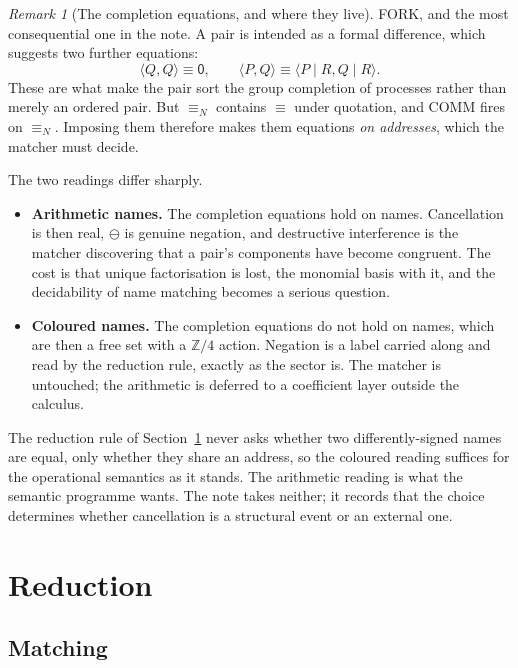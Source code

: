 \documentclass[11pt]{article}
\theoremstyle{definition}
\theoremstyle{remark}
\newtheorem{remark}[theorem]{Remark}
\newcommand{\pzero}{\mathsf{0}}
\newcommand{\dip}[2]{\ensuremath{\langle #1 , #2 \rangle}}
\newcommand{\negop}{\ensuremath{\ominus}}
\newcommand{\scong}{\ensuremath{\equiv}}
\newcommand{\nameq}{\ensuremath{\equiv_{N}}}
\begin{document}
\begin{remark}[The completion equations, and where they live]
\label{rem:completion}
FORK, and the most consequential one in the note. A pair is intended as a formal
difference, which suggests two further equations:
\[
  \dip{Q}{Q} \scong \pzero,
  \qquad
  \dip{P}{Q} \scong \dip{P \mid R}{Q \mid R}.
\]
These are what make the pair sort the group completion of processes rather than
merely an ordered pair. But $\nameq$ contains $\scong$ under quotation, and COMM
fires on $\nameq$. Imposing them therefore makes them equations \emph{on
addresses}, which the matcher must decide.

The two readings differ sharply.
\begin{itemize}
\item \textbf{Arithmetic names.} The completion equations hold on names.
  Cancellation is then real, $\negop$ is genuine negation, and destructive
  interference is the matcher discovering that a pair's components have become
  congruent. The cost is that unique factorisation is lost, the monomial basis
  with it, and the decidability of name matching becomes a serious question.
\item \textbf{Coloured names.} The completion equations do not hold on names,
  which are then a free set with a $\mathbb{Z}/4$ action. Negation is a label
  carried along and read by the reduction rule, exactly as the sector is. The
  matcher is untouched; the arithmetic is deferred to a coefficient layer
  outside the calculus.
\end{itemize}
The reduction rule of Section~\ref{sec:comm} never asks whether two
differently-signed names are equal, only whether they share an address, so the
coloured reading suffices for the operational semantics as it stands. The
arithmetic reading is what the semantic programme wants. The note takes neither;
it records that the choice determines whether cancellation is a structural event
or an external one.
\end{remark}

\section{Reduction}
\label{sec:comm}

\subsection{Matching}
\label{sec:matching}
\end{document}
